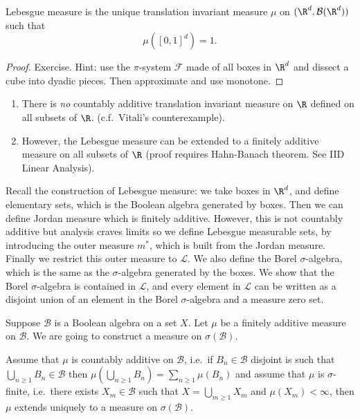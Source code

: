 \documentclass[a4paper]{article}
\begin{document}
\begin{proposition}
  Lebesgue measure is the unique translation invariant measure \(\mu\) on \((\R^d, \mathcal B(\R^d))\) such that
  \[
    \mu([0, 1]^d) = 1.
  \]
\end{proposition}

\begin{proof}
  Exercise. Hint: use the \(\pi\)-system \(\mathcal F\) made of all boxes in \(\R^d\) and dissect a cube into dyadic pieces. Then approximate and use monotone.
\end{proof}

\begin{remark}\leavevmode
  \begin{enumerate}
  \item There is \emph{no} countably additive translation invariant measure on \(\R\) defined on all subsets of \(\R\). (c.f.\ Vitali's counterexample).
  \item However, the Lebesgue measure can be extended to a finitely additive measure on all subsets of \(\R\) (proof requires Hahn-Banach theorem. See IID Linear Analysis).
  \end{enumerate}
\end{remark}

Recall the construction of Lebesgue measure: we take boxes in \(\R^d\), and define elementary sets, which is the Boolean algebra generated by boxes. Then we can define Jordan measure which is finitely additive. However, this is not countably additive but analysis craves limits so we define Lebesgue measurable sets, by introducing the outer measure \(m^*\), which is built from the Jordan measure. Finally we restrict this outer measure to \(\mathcal L\). We also define the Borel \(\sigma\)-algebra, which is the same as the \(\sigma\)-algebra generated by the boxes. We show that the Borel \(\sigma\)-algebra is contained in \(\mathcal L\), and every element in \(\mathcal L\) can be written as a disjoint union of an element in the Borel \(\sigma\)-algebra and a measure zero set.

Suppose \(\mathcal B\) is a Boolean algebra on a set \(X\). Let \(\mu\) be a finitely additive measure on \(\mathcal B\). We are going to construct a measure on \(\sigma(\mathcal B)\).

\begin{theorem}
  Assume that \(\mu\) is countably additive on \(\mathcal B\), i.e.\ if \(B_n \in \mathcal B\) disjoint is such that \(\bigcup_{n \geq 1} B_n \in \mathcal B\) then \(\mu(\bigcup_{n \geq 1} B_n) = \sum_{n \geq 1} \mu(B_n)\) and assume that \(\mu\) is \(\sigma\)-finite, i.e.\ there exists \(X_m \in \mathcal B\) such that \(X = \bigcup_{m \geq 1} X_m\) and \(\mu(X_m) < \infty\), then \(\mu\) extends uniquely to a measure on \(\sigma(\mathcal B)\).
\end{theorem}
\end{document}
